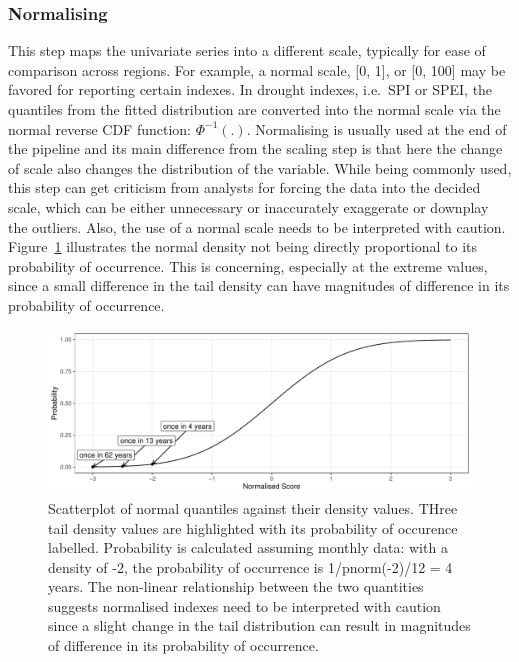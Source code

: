 \documentclass[
]{interact}
\begin{document}
\hypertarget{normalising}{%
\subsubsection{Normalising}\label{normalising}}

This step maps the univariate series into a different scale, typically
for ease of comparison across regions. For example, a normal scale,
{[}0, 1{]}, or {[}0, 100{]} may be favored for reporting certain
indexes. In drought indexes, i.e.~SPI or SPEI, the quantiles from the
fitted distribution are converted into the normal scale via the normal
reverse CDF function: \(\Phi^{-1}(.)\). Normalising is usually used at
the end of the pipeline and its main difference from the scaling step is
that here the change of scale also changes the distribution of the
variable. While being commonly used, this step can get criticism from
analysts for forcing the data into the decided scale, which can be
either unnecessary or inaccurately exaggerate or downplay the outliers.
Also, the use of a normal scale needs to be interpreted with caution.
Figure~\ref{fig-normalising} illustrates the normal density not being
directly proportional to its probability of occurrence. This is
concerning, especially at the extreme values, since a small difference
in the tail density can have magnitudes of difference in its probability
of occurrence.

\begin{figure}

{\centering \includegraphics{tidyindex_files/figure-pdf/fig-normalising-1.pdf}

}

\caption{\label{fig-normalising}Scatterplot of normal quantiles against
their density values. THree tail density values are highlighted with its
probability of occurence labelled. Probability is calculated assuming
monthly data: with a density of -2, the probability of occurrence is
1/pnorm(-2)/12 = 4 years. The non-linear relationship between the two
quantities suggests normalised indexes need to be interpreted with
caution since a slight change in the tail distribution can result in
magnitudes of difference in its probability of occurrence.}

\end{figure}
\end{document}
